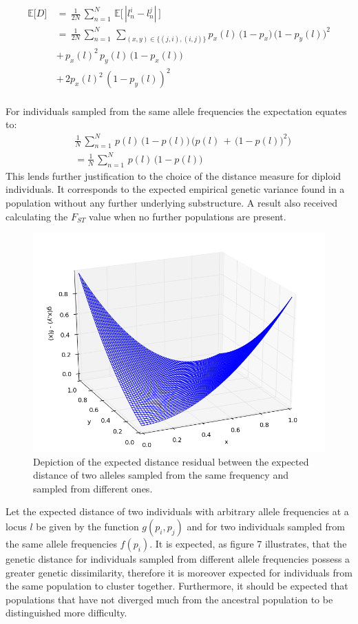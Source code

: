 \documentclass[a4paper, 11pt]{article}
\begin{document}
\begin{align*}
\mathbb{E}\big[D\big]\, &=\, \frac{1}{2N}\,\sum^{N}_{n = 1}\, \mathbb{E}\big[\,|l^i_n - l^j_n|\,\big] \\
\,&=\, \frac{1}{2N}\, \sum^{N}_{n = 1}\, \sum_{(x, y) \in \{(j, i), (i, j)\}} p_x(l)\,\big(1-p_x\big)\,\big(1-p_y(l)\big)^2 \\
&+\, p_x(l)^2\,p_y(l)\,\big(1-p_x(l)\big) \\
&+\, 2p_x(l)^2\,(1-p_y(l))^2
\end{align*} \\
For individuals sampled from the same allele frequencies the expectation equates to:
\begin{align*}
& \frac{1}{N}\, \sum^{N}_{n = 1}\, p(l)\,\big(1-p(l)\big)\,\big(p(l)\,+\,(1-p(l)\big)^2\big) \\
&= \frac{1}{N}\, \sum^{N}_{n = 1}\, p(l)\,\big(1-p(l)\big)
\end{align*}
This lends further justification to the choice of the distance measure for diploid individuals. It corresponds to the expected empirical genetic variance found in a population without any further underlying substructure. A result also received calculating the $F_{ST}$ value when no further populations are present.\\
\begin{figure}
\centering
\includegraphics[scale=0.55]{plot_distance}
\caption{Depiction of the expected distance residual between the expected distance of two alleles sampled from the same frequency and sampled from different ones.}
\end{figure}
Let the expected distance of two individuals with arbitrary allele frequencies at a locus $l$ be given by the function $g(p_i, p_j)$ and for two individuals sampled from the same allele frequencies $f(p_i)$. It is expected, as figure 7 illustrates, that the genetic distance for individuals sampled from different allele frequencies possess a greater genetic dissimilarity, therefore it is moreover expected for individuals from the same population to cluster together. Furthermore, it should be expected that populations that have not diverged much from the ancestral population to be distinguished more difficulty.\\
\end{document}
